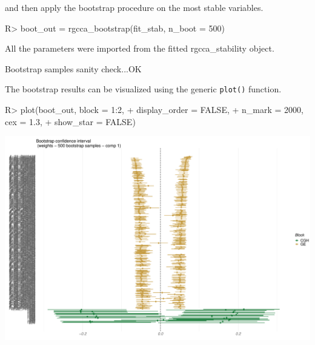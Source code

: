 \documentclass[
]{jss}
\begin{document}
\normalsize

and then apply the bootstrap procedure on the most stable variables.

\footnotesize

\begin{CodeChunk}
\begin{CodeInput}
R> boot_out = rgcca_bootstrap(fit_stab, n_boot = 500)
\end{CodeInput}
\begin{CodeOutput}
All the parameters were imported from the fitted rgcca_stability object.
\end{CodeOutput}
\begin{CodeOutput}
Bootstrap samples sanity check...OK
\end{CodeOutput}
\end{CodeChunk}

\normalsize

The bootstrap results can be visualized using the generic
\texttt{plot()} function.

\footnotesize

\begin{CodeChunk}
\begin{CodeInput}
R> plot(boot_out, block = 1:2, 
+      display_order = FALSE, 
+      n_mark = 2000, cex = 1.3, 
+      show_star = FALSE)
\end{CodeInput}


\begin{center}\includegraphics{RGCCA_21022023_files/figure-latex/unnamed-chunk-46-1} \end{center}

\end{CodeChunk}
\end{document}
